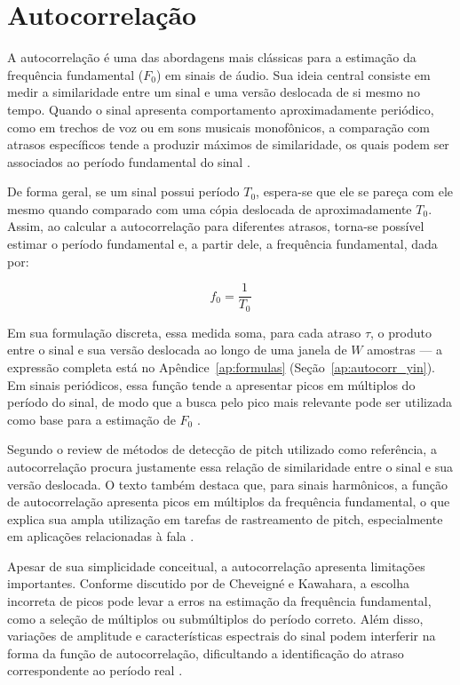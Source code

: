\section{\label{sec:autocorrelacao}Autocorrelação}

A autocorrelação é uma das abordagens mais clássicas para a estimação da frequência fundamental (\(F_0\)) em sinais de áudio. Sua ideia central consiste em medir a similaridade entre um sinal e uma versão deslocada de si mesmo no tempo. Quando o sinal apresenta comportamento aproximadamente periódico, como em trechos de voz ou em sons musicais monofônicos, a comparação com atrasos específicos tende a produzir máximos de similaridade, os quais podem ser associados ao período fundamental do sinal \cite{delacuadra2007pitch,decheveigne2002yin}.

De forma geral, se um sinal possui período \(T_0\), espera-se que ele se pareça com ele mesmo quando comparado com uma cópia deslocada de aproximadamente \(T_0\). Assim, ao calcular a autocorrelação para diferentes atrasos, torna-se possível estimar o período fundamental e, a partir dele, a frequência fundamental, dada por:

\begin{equation}
f_0 = \frac{1}{T_0}
\end{equation}

Em sua formulação discreta, essa medida soma, para cada atraso \(\tau\), o produto entre o sinal e sua versão deslocada ao longo de uma janela de \(W\) amostras --- a expressão completa está no Apêndice~\ref{ap:formulas} (Seção~\ref{ap:autocorr_yin}). Em sinais periódicos, essa função tende a apresentar picos em múltiplos do período do sinal, de modo que a busca pelo pico mais relevante pode ser utilizada como base para a estimação de \(F_0\) \cite{decheveigne2002yin}.

Segundo o review de métodos de detecção de pitch utilizado como referência, a autocorrelação procura justamente essa relação de similaridade entre o sinal e sua versão deslocada. O texto também destaca que, para sinais harmônicos, a função de autocorrelação apresenta picos em múltiplos da frequência fundamental, o que explica sua ampla utilização em tarefas de rastreamento de pitch, especialmente em aplicações relacionadas à fala \cite{delacuadra2007pitch}.

Apesar de sua simplicidade conceitual, a autocorrelação apresenta limitações importantes. Conforme discutido por de Cheveigné e Kawahara, a escolha incorreta de picos pode levar a erros na estimação da frequência fundamental, como a seleção de múltiplos ou submúltiplos do período correto. Além disso, variações de amplitude e características espectrais do sinal podem interferir na forma da função de autocorrelação, dificultando a identificação do atraso correspondente ao período real \cite{decheveigne2002yin}.


